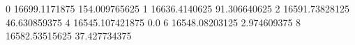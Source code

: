 0 16699.1171875 154.009765625
1 16636.4140625 91.306640625
2 16591.73828125 46.630859375
4 16545.107421875 0.0
6 16548.08203125 2.974609375
8 16582.53515625 37.427734375

